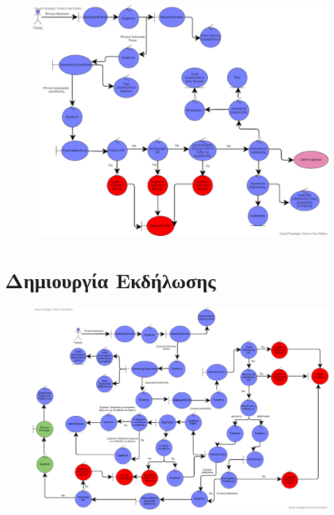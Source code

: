 \documentclass{article}
\begin{document}
\begin{figure}[!htb]
        \centering
        \includegraphics[width=1\textwidth]{Create Post.png}
\end{figure}

\newpage

\section{Δημιουργία Εκδήλωσης}

\vspace{0.2cm}

\begin{figure}[!htb]
        \centering
        \includegraphics[width=1.1\textwidth]{Make Event.png}
\end{figure}
\end{document}
